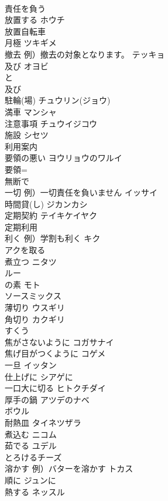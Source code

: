 \documentclass[8pt]{extreport}
\begin{document}
\begin{CJK}{UTF8}{min}
\\	責任を負う	
\\	放置する	ホウチ 
\\	放置自転車 
\\	月極	ツキギメ 
\\	撤去 例）撤去の対象となります。	テッキョ 
\\	及び	オヨビ 
\\	と
\\	及び
\\	駐輪(場)	チュウリン(ジョウ) 
\\	満車	マンシャ 
\\	注意事項	チュウイジコウ 
\\	施設	シセツ 
\\	利用案内	
\\	要領の悪い	ヨウリョウのワルイ 
\\	要領=
\\	無断で	
\\	一切 例）一切責任を負いません	イッサイ 
\\	時間貸(し)	ジカンカシ 
\\	定期契約	テイキケイヤク 
\\	定期利用	
\\	利く 例）学割も利く	キク 
\\	アクを取る	
\\	煮立つ	ニタツ 
\\	ルー	
\\	の素	モト 
\\	ソースミックス	
\\	薄切り	ウスギリ 
\\	角切り	カクギリ 
\\	すくう	
\\	焦がさないように	コガサナイ 
\\	焦げ目がつくように	コゲメ
\\	一旦	イッタン 
\\	仕上げに	シアゲに 
\\	一口大に切る	ヒトクチダイ 
\\	厚手の鍋	アツデのナベ 
\\	ボウル	
\\	耐熱皿	タイネツザラ 
\\	煮込む	ニコム 
\\	茹でる	ユデル 
\\	とろけるチーズ	
\\	溶かす 例）バターを溶かす	トカス 
\\	順に	ジュンに 
\\	熱する	ネッスル 

\end{CJK}
\end{document}
